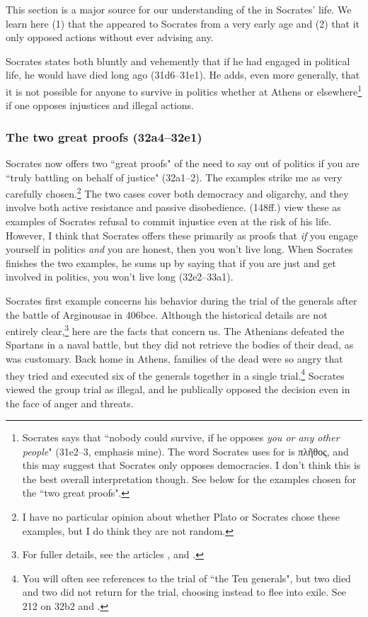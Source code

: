 \documentclass[11pt]{article}
\begin{document}
This section is a major source for our understanding of the  in Socrates' life.  We learn here (1) that the  appeared to Socrates from a very early age and (2) that it only opposed actions without ever advising any.

Socrates states both bluntly and vehemently that if he had engaged in political life, he would have died long ago (31d6--31e1).  He adds, even more generally, that it is not possible for anyone to survive in politics whether at Athens or elsewhere\footnote{Socrates says that ``nobody could survive, if he opposes \emph{you or any other people}" (31e2--3, emphasis mine).  The word Socrates uses for  is {\g πλῆθος}, and this may suggest that Socrates only opposes democracies.  I don't think this is the best overall interpretation though.  See below for the examples chosen for the ``two great proofs".} if one opposes injustices and illegal actions.


\subsubsection{The two great proofs (32a4--32e1)}

Socrates now offers two ``great proofs" of the need to say out of politics if you are ``truly battling on behalf of justice" (32a1--2).  The examples strike me as very carefully chosen.\footnote{I have no particular opinion about whether Plato or Socrates chose these examples, but I do think they are not random.}  The two cases cover both democracy and oligarchy, and they involve both active resistance and passive disobedience.  \citet{brickhouse2004} (148ff.) view these as examples of Socrates refusal to commit injustice even at the risk of his life.  However, I think that Socrates offers these primarily as proofs that \emph{if} you engage yourself in politics \emph{and} you are honest, then you won't live long.  When Socrates finishes the two examples, he sums up by saying that if you are just and get involved in politics, you won't live long (32e2--33a1).

Socrates first example concerns his behavior during the trial of the generals after the battle of Arginousae in 406bce.  Although the historical details are not entirely clear,\footnote{For fuller details, see the articles \citet{andrewes1974}, \citet{lang1990} and \citet{lang1992}.} here are the facts that concern us.  The Athenians defeated the Spartans in a naval battle, but they did not retrieve the bodies of their dead, as was customary.  Back home in Athens, families of the dead were so angry that they tried and executed six of the generals together in a single trial.\footnote{You will often see references to the trial of ``the Ten generals", but two died and two did not return for the trial, choosing instead to flee into exile.  See \citet{burnet1924} 212 on 32b2 and \citet{lang1992}.}  Socrates viewed the group trial as illegal, and he publically opposed the decision even in the face of anger and threats.
\end{document}
